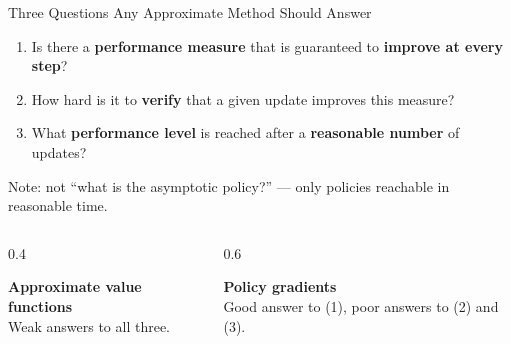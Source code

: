 \documentclass[aspectratio=169]{beamer}
\begin{document}
\begin{frame}{Three Questions Any Approximate Method Should Answer}
  \begin{enumerate}
    \item Is there a \textbf{performance measure} that is guaranteed to \textbf{improve at every step}?
    \item How hard is it to \textbf{verify} that a given update improves this measure?
    \item What \textbf{performance level} is reached after a \textbf{reasonable number} of updates?
  \end{enumerate}

  \vspace{10pt}
  \begin{noteframe}
    \small Note: not ``what is the asymptotic policy?'' --- only policies reachable in reasonable time.
  \end{noteframe}

  \vspace{6pt}
  \begin{columns}[t]
    \begin{column}{0.4\textwidth}
      \begin{warmbox}
        \small\textbf{\color{AtlasWarm}Approximate value functions}\\
        Weak answers to all three.
      \end{warmbox}
    \end{column}
    \begin{column}{0.6\textwidth}
      \begin{coolbox}
        \small\textbf{\color{AtlasCool}Policy gradients}\\
        Good answer to (1), poor answers to (2) and (3).
      \end{coolbox}
    \end{column}
  \end{columns}
\end{frame}
\end{document}
